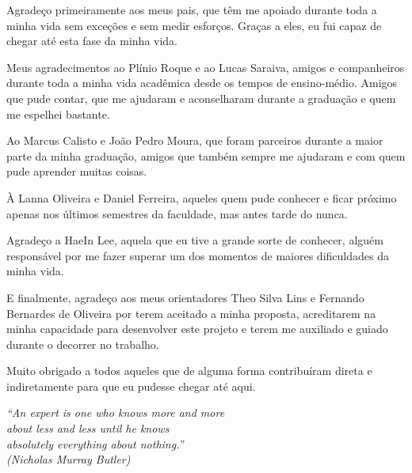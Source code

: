 \documentclass[
  12pt,       %
  openright,      %
  oneside,      %
  a4paper,      %
  english,      %
  french,        %
  spanish,     %
  brazil        %
  ]{abntex2-decsi}
\begin{document}


% 



\begin{agradecimentos}

Agradeço primeiramente aos meus pais, que têm me apoiado durante toda a minha vida sem exceções e sem medir esforços. Graças a eles, eu fui capaz de chegar até esta fase da minha vida.

Meus agradecimentos ao Plínio Roque e ao Lucas Saraiva, amigos e companheiros durante toda a minha vida acadêmica desde os tempos de ensino-médio. Amigos que pude contar, que me ajudaram e aconselharam durante a graduação e quem me espelhei bastante.

Ao Marcus Calisto e João Pedro Moura, que foram parceiros durante a maior parte da minha graduação, amigos que também sempre me ajudaram e com quem pude aprender muitas coisas.

À Lanna Oliveira e Daniel Ferreira, aqueles quem pude conhecer e ficar próximo apenas nos últimos semestres da faculdade, mas antes tarde do nunca.

Agradeço a HaeIn Lee, aquela que eu tive a grande sorte de conhecer, alguém responsável por me fazer superar um dos momentos de maiores dificuldades da minha vida.

E finalmente, agradeço aos meus orientadores Theo Silva Lins e Fernando Bernardes de Oliveira por terem aceitado a minha proposta, acreditarem na minha capacidade para desenvolver este projeto e terem me auxiliado e guiado durante o decorrer no trabalho.

Muito obrigado a todos aqueles que de alguma forma contribuíram direta e indiretamente para que eu pudesse chegar até aqui.




\end{agradecimentos}

\begin{epigrafe}
    \vspace*{\fill}
  \begin{flushright}
    \textit{``An expert is one who knows more and more\\
    about less and less until he knows\\
    absolutely everything about nothing.''\\
    (Nicholas Murray Butler)}
  \end{flushright}
\end{epigrafe}
\end{document}
